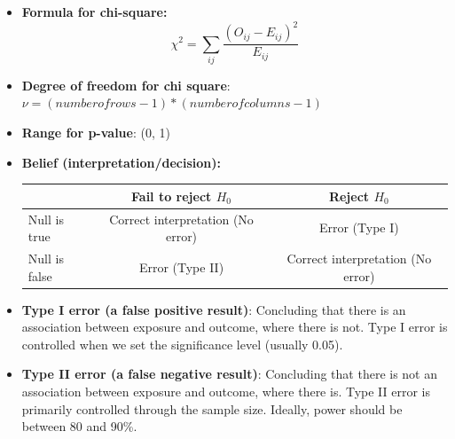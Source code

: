 \documentclass[12pt]{book}
\begin{document}
\begin{itemize}
\item \textbf{Formula for chi-square:}
$$\chi^2=\sum_{ij}\frac{(O_{ij}-E_{ij})^2}{E_{ij}}$$
\item \textbf{Degree of freedom for chi square}: $\nu = (number of rows - 1) * (number of columns - 1)$
\item \textbf{Range for p-value}: (0, 1)
\item \textbf{Belief (interpretation/decision):}
\begin{table}[h!]
\centering
\begin{tabular}{|l|c|c|}
\hline
& Fail to reject $H_0$ & Reject $H_0$ \\ \hline
Null is true & Correct interpretation (No error) & Error (Type I) \\ \hline
Null is false & Error (Type II) & Correct interpretation (No error) \\
\hline
\end{tabular}
\end{table}
\item \textbf{Type I error (a false positive result)}: Concluding that there is an association between exposure and outcome, where there is not. Type I error is controlled when we set the significance level (usually 0.05).
\item \textbf{Type II error (a false negative result)}: Concluding that there is not an association between exposure and outcome, where there is. Type II error is primarily controlled through the sample size. Ideally, power should be between 80 and 90\%.
\end{itemize}

\graphicspath{{./}}
\newpage

\pagestyle{fancy}
\end{document}
